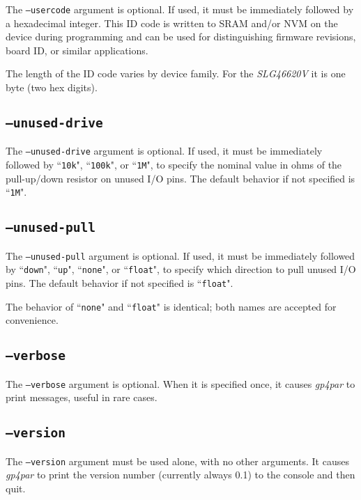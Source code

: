 \documentclass[11pt]{article}
\newcommand{\namestyle}[1]{\textit{#1}}
\newcommand{\tokenstyle}[1]{\texttt{#1}}
\begin{document}
The \texttt{--usercode} argument is optional. If used, it must be immediately followed by a hexadecimal integer. This
ID code is written to SRAM and/or NVM on the device during programming and can be used for distinguishing firmware
revisions, board ID, or similar applications.

The length of the ID code varies by device family. For the \namestyle{SLG46620V} it is one byte (two hex digits).

\subsection{\texttt{--unused-drive}}

The \texttt{--unused-drive} argument is optional. If used, it must be immediately followed by ``\tokenstyle{10k}",
``\tokenstyle{100k}", or ``\tokenstyle{1M}", to specify the nominal value in ohms of the pull-up/down resistor on
unused I/O pins. The default behavior if not specified is ``\tokenstyle{1M}".

\subsection{\texttt{--unused-pull}}

The \texttt{--unused-pull} argument is optional. If used, it must be immediately followed by ``\tokenstyle{down}",
``\tokenstyle{up}", ``\tokenstyle{none}", or ``\tokenstyle{float}", to specify which direction to pull unused I/O pins.
The default behavior if not specified is ``\tokenstyle{float}".

The behavior of ``\tokenstyle{none}" and ``\tokenstyle{float}" is identical; both names are accepted for convenience.

\subsection{\texttt{--verbose}}

The \texttt{--verbose} argument is optional. When it is specified once, it causes \namestyle{gp4par} to print
messages, useful in rare cases.

\subsection{\texttt{--version}}

The \texttt{--version} argument must be used alone, with no other arguments. It causes \namestyle{gp4par} to print the version number
(currently always 0.1) to the console and then quit.
\end{document}
